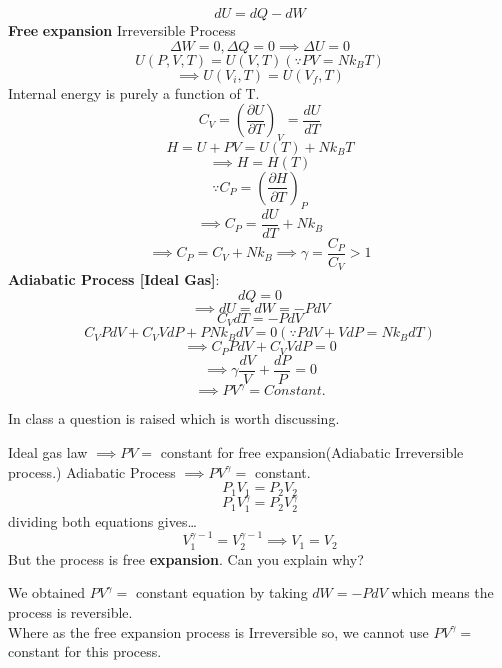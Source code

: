\[
    dU = dQ - dW
\]
\textbf{Free} \textbf{expansion} 
Irreversible Process
\[
    \Delta W = 0, \Delta Q = 0 \implies \Delta U = 0
\]
\[
    U(P,V,T) = U(V,T) \left(\because PV = Nk_{B}T\right)
\]
\[
    \implies U(V_{i} , T) = U(V_{f} , T)
\]
Internal energy is purely a function of T.
\[
    C_{V} =\left(\frac{\partial U}{\partial T}\right)_{V}  = \frac{dU}{dT}
\]
\[
    H = U + PV = U(T)+N k_{B} T 
\]
\[
    \implies H=H(T) 
\]
\[
   \because C_{P} = \left(\frac{\partial H}{\partial T}\right)_{P} 
\]
\[
   \implies C_P = \frac{dU}{dT} + N k_{B} 
\]
\[
    \implies C_P = C_V + N k_{B} \implies \gamma = \frac{C_{P} }{C_{V}}>1
\]\newpage
\textbf{Adiabatic Process [Ideal Gas]}:\\
\[
    dQ = 0
\]
\[
    \implies dU = dW = -PdV
\]
\[
    C_{V} dT = -P dV
\]
\[
    C_{V} PdV + C_{V} VdP + P N k_{B} dV = 0 \left(\because PdV + VdP = N k_{B} dT \right)
\]
\[
  \implies   C_{P} P dV + C_{V} V dP = 0
\]
\[
    \implies \gamma \frac{dV}{V} + \frac{dP}{P} = 0
\]
\[
    \implies PV^\gamma = Constant.
\]
\begin{note}
    In class a question is raised which is worth discussing.
    \begin{exercise}
        Ideal gas law \(\implies PV = \) constant for free expansion(Adiabatic Irreversible process.)
        Adiabatic Process \(\implies PV^\gamma =\)  constant.
        \[
            P_1 V_1 = P_2 V_2
        \]
        \[
            P_1 V_1 ^ \gamma = P_2 V_2 ^ \gamma
        \]
        dividing both equations gives\dots
        \[
            V_1 ^ {\gamma-1} = V_2 ^ {\gamma -1} \implies V_1 = V_2 
        \]
        But the process is free \textbf{expansion}.
        Can you explain why?
        \begin{answer}
            We obtained \(PV^\gamma =\) constant equation by taking $dW = -PdV$ which means the process is reversible.\\
            Where as the free expansion process is Irreversible so, we cannot use \(PV^\gamma =\) constant for this process.
        \end{answer}
    \end{exercise}
\end{note}
